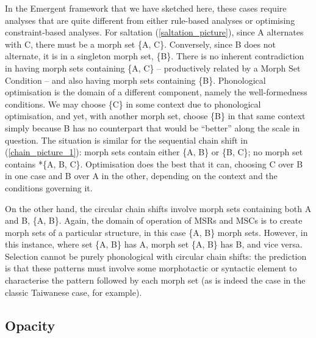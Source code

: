  In the Emergent framework that we have sketched here, these cases require analyses that are quite different from either rule-based analyses or optimising constraint-based analyses. For saltation (\ref{saltation_picture}), since A alternates with C, there must be a morph set  \{A, C\}. Conversely, since B does not alternate, it is in a singleton morph set, \{B\}.  There is no inherent contradiction in having morph sets containing \{A, C\} -- productively related by a Morph Set Condition -- and also having morph sets containing \{B\}. Phonological optimisation is the domain of a different component, namely the well-formedness conditions. We may choose \{C\} in some context due to phonological optimisation, and yet, with another morph set, choose \{B\} in that same context simply because B has no counterpart that would be ``better'' along the scale in question. The situation is similar for  the sequential chain shift in (\ref{chain_picture_1}): morph sets contain either \{A, B\} or \{B, C\}; no morph set contains *\{A, B, C\}. Optimisation does the best that it can, choosing C over B in one case and B over A in the other, depending on the context and the conditions governing it.

On the other hand, the circular chain shifts involve morph sets containing both A and B, \{A, B\}. Again, the domain of operation of MSRs and MSCs is to create morph sets of a particular structure, in this case \{A, B\} morph sets. However, in this instance, where set \{A, B\} has A, morph set \{A, B\} has B, and vice versa. Selection cannot be purely phonological with circular chain shifts: the prediction is that these patterns must involve some morphotactic or syntactic element to characterise the pattern followed by each morph set (as is indeed the case in the classic Taiwanese case, for example).


\subsection{Opacity} 


